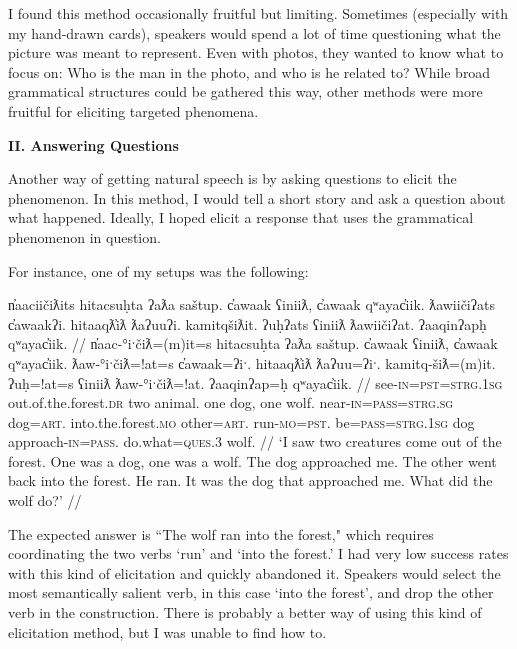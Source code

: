 I found this method occasionally fruitful but limiting. Sometimes (especially with my hand-drawn cards), speakers would spend a lot of time questioning what the picture was meant to represent. Even with photos, they wanted to know what to focus on: Who is the man in the photo, and who is he related to? While broad grammatical structures could be gathered this way, other methods were more fruitful for eliciting targeted phenomena.

\vspace{8pt}

\noindent \textbf{II. Answering Questions}

Another way of getting natural speech is by asking questions to elicit the phenomenon. In this method, I would tell a short story and ask a question about what happened. Ideally, I hoped elicit a response that uses the grammatical phenomenon in question.

For instance, one of my setups was the following:

\ex \label{ex:wolfsetup}
\begingl
\glpreamble n̓aaciičiƛits hitacsuḥta ʔaƛa saštup. c̓awaak ʕiniiƛ, c̓awaak qʷayac̓iik. ƛawiičiʔats c̓awaakʔi. hitaaqƛ̓iƛ ƛaʔuuʔi. kamitqšiƛit. ʔuḥʔats ʕiniiƛ ƛawiičiʔat. ʔaaqinʔapḥ qʷayac̓iik. //
\gla n̓aac-°iˑčiƛ=(m)it=s hitacsuḥta ʔaƛa saštup. c̓awaak ʕiniiƛ, c̓awaak qʷayac̓iik. ƛaw-°iˑčiƛ=!at=s c̓awaak=ʔiˑ. hitaaqƛ̓iƛ ƛaʔuu=ʔiˑ. kamitq-šiƛ=(m)it. ʔuḥ=!at=s ʕiniiƛ ƛaw-°iˑčiƛ=!at. ʔaaqinʔap=ḥ qʷayac̓iik. //
\glb see-\textsc{in}=\textsc{pst}=\textsc{strg.1sg} out.of.the.forest.\textsc{dr} two animal. one dog, one wolf. near-\textsc{in}=\textsc{pass}=\textsc{strg.sg} dog=\textsc{art}. into.the.forest.\textsc{mo} other=\textsc{art}. run-\textsc{mo}=\textsc{pst}. be=\textsc{pass}=\textsc{strg.1sg} dog approach-\textsc{in}=\textsc{pass}. do.what=\textsc{ques.3} wolf. //
\glft `I saw two creatures come out of the forest. One was a dog, one was a wolf. The dog approached me. The other went back into the forest. He ran. It was the dog that approached me. What did the wolf do?' //
\endgl
\xe

The expected answer is ``The wolf ran into the forest," which requires coordinating the two verbs `run' and `into the forest.' I had very low success rates with this kind of elicitation and quickly abandoned it. Speakers would select the most semantically salient verb, in this case `into the forest', and drop the other verb in the construction. There is probably a better way of using this kind of elicitation method, but I was unable to find how to.

